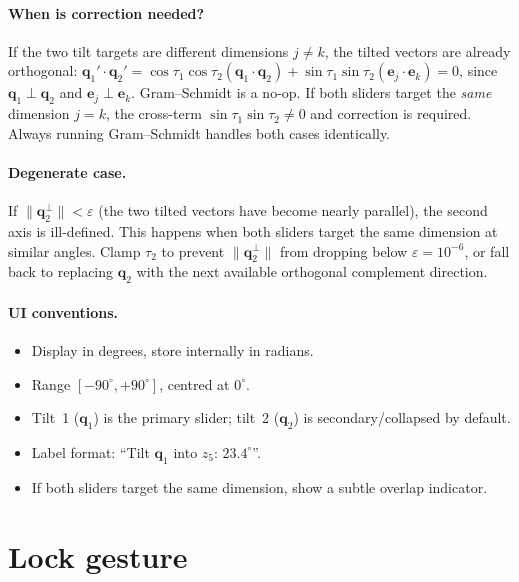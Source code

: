\documentclass[11pt]{report}
\begin{document}
\paragraph{When is correction needed?} If the two tilt targets are different dimensions $j\neq k$, the tilted vectors are already orthogonal: $\mathbf q_1'\cdot\mathbf q_2' = \cos\tau_1\cos\tau_2(\mathbf q_1\cdot\mathbf q_2)+\sin\tau_1\sin\tau_2(\mathbf e_j\cdot\mathbf e_k)=0$, since $\mathbf q_1\perp\mathbf q_2$ and $\mathbf e_j\perp\mathbf e_k$. Gram--Schmidt is a no-op. If both sliders target the \emph{same} dimension $j=k$, the cross-term $\sin\tau_1\sin\tau_2\neq 0$ and correction is required. Always running Gram--Schmidt handles both cases identically.

\paragraph{Degenerate case.} If $\|\mathbf q_2^\perp\|<\varepsilon$ (the two tilted vectors have become nearly parallel), the second axis is ill-defined. This happens when both sliders target the same dimension at similar angles. Clamp $\tau_2$ to prevent $\|\mathbf q_2^\perp\|$ from dropping below $\varepsilon=10^{-6}$, or fall back to replacing $\mathbf q_2$ with the next available orthogonal complement direction.

\paragraph{UI conventions.}
\begin{itemize}[nosep]
\item Display in degrees, store internally in radians.
\item Range $[-90^\circ, +90^\circ]$, centred at $0^\circ$.
\item Tilt~1 ($\mathbf q_1$) is the primary slider; tilt~2 ($\mathbf q_2$) is secondary/collapsed by default.
\item Label format: ``Tilt $\mathbf q_1$ into $z_5$: $23.4^\circ$''.
\item If both sliders target the same dimension, show a subtle overlap indicator.
\end{itemize}

\section{Lock gesture}
\label{sec:lock}
\end{document}
